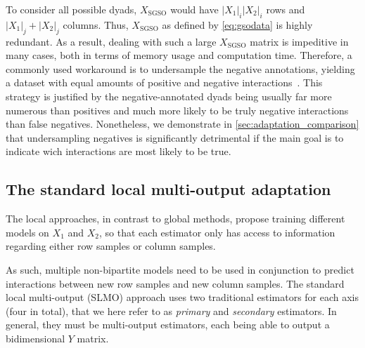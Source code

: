 To consider all possible dyads, $X_\text{SGSO}$ would have $|X_1|_i|X_2|_i$ rows and $|X_1|_j+|X_2|_j$ columns. Thus, $X_\text{SGSO}$ as defined by \autoref{eq:gsodata} is highly redundant.
As a result, dealing with such a large $X_\text{SGSO}$ matrix is impeditive in many cases, both in terms of memory usage and computation time. Therefore, a commonly used workaround is to undersample the negative annotations, yielding a dataset with equal amounts of positive and negative interactions~\cite{ozturk2018deepdta,huang2020moltrans}.
This strategy is justified by the negative-annotated dyads being usually far more numerous than positives and much more likely to be truly negative interactions than false negatives.
Nonetheless, we demonstrate in \autoref{sec:adaptation_comparison} that undersampling negatives is significantly detrimental if the main goal is to indicate wich interactions are most likely to be true.


\subsection{The standard local multi-output adaptation}
\label{sec:slmo}

The local approaches, in contrast to global methods, propose training different models on $X_1$ and $X_2$, so that each estimator only has access to information regarding either row samples or column samples.

As such, multiple non-bipartite models need to be used in conjunction to predict interactions between new row samples and new column samples. The standard local multi-output (SLMO) approach uses two traditional estimators for each axis (four in total), that we here refer to as \emph{primary} and \emph{secondary} estimators.
In general, they must be multi-output estimators, each being able to output a bidimensional $Y$ matrix.

